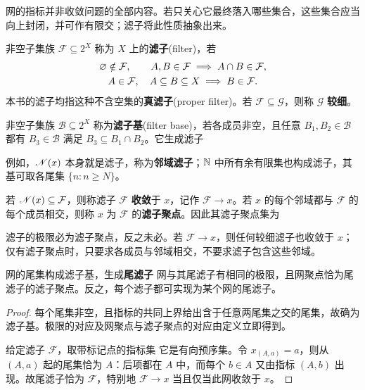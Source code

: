 网的指标并非收敛问题的全部内容。若只关心它最终落入哪些集合，这些集合应当向上封闭，并可作有限交；滤子将此性质抽象出来。

\begin{definition}
    非空子集族 $\mathcal F\subseteq2^X$ 称为 $X$ 上的\textbf{滤子}(filter)，若
    \begin{gather*}
        \varnothing\notin\mathcal F,\qquad
        A,B\in\mathcal F\implies A\cap B\in\mathcal F,\\
        A\in\mathcal F,\quad A\subseteq B\subseteq X\implies B\in\mathcal F.
    \end{gather*}
    本书的滤子均指这种不含空集的\textbf{真滤子}(proper filter)。若 $\mathcal F\subseteq\mathcal G$，则称 $\mathcal G$ \textbf{较细}。
\end{definition}

\begin{definition}
    非空子集族 $\mathcal B\subseteq2^X$ 称为\textbf{滤子基}(filter base)，若各成员非空，且任意 $B_1,B_2\in\mathcal B$ 都有 $B_3\in\mathcal B$ 满足 $B_3\subseteq B_1\cap B_2$。它生成滤子
\end{definition}

例如，$\mathscr N(x)$ 本身就是滤子，称为\textbf{邻域滤子}；$\mathbb{N}$ 中所有余有限集也构成滤子，其基可取各尾集 $\{n:n\geqslant N\}$。

\begin{definition}
    若 $\mathscr N(x)\subseteq\mathcal F$，则称滤子 $\mathcal F$ \textbf{收敛}于 $x$，记作 $\mathcal F\to x$。若 $x$ 的每个邻域都与 $\mathcal F$ 的每个成员相交，则称 $x$ 为 $\mathcal F$ 的\textbf{滤子聚点}。因此其滤子聚点集为
\end{definition}

滤子的极限必为滤子聚点，反之未必。若 $\mathcal F\to x$，则任何较细滤子也收敛于 $x$；仅有滤子聚点时，只要求各成员与邻域相交，不要求滤子包含这些邻域。

\begin{theorem}[网与滤子的对应]\label{thm:net-filter}
    网的尾集构成滤子基，生成\textbf{尾滤子}
    网与其尾滤子有相同的极限，且网聚点恰为尾滤子的滤子聚点。反之，每个滤子都可实现为某个网的尾滤子。
\end{theorem}
\begin{proof}
    每个尾集非空，且指标的共同上界给出含于任意两尾集之交的尾集，故确为滤子基。极限的对应及网聚点与滤子聚点的对应由定义立即得到。

    给定滤子 $\mathcal F$，取带标记点的指标集
    它是有向预序集。令 $x_{(A,a)}=a$，则从 $(A,a)$ 起的尾集恰为 $A$：后项都在 $A$ 中，而每个 $b\in A$ 又由指标 $(A,b)$ 出现。故尾滤子恰为 $\mathcal F$，特别地 $\mathcal F\to x$ 当且仅当此网收敛于 $x$。
\end{proof}

